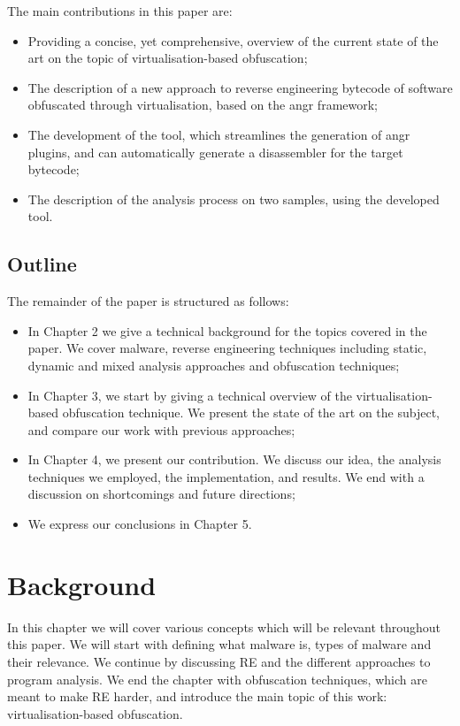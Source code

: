 The main contributions in this paper are:

\begin{itemize}
    \item Providing a concise, yet comprehensive, overview of the current state of the art on the topic of virtualisation-based obfuscation;
    \item The description of a new approach to reverse engineering bytecode of software obfuscated through virtualisation, based on the angr framework;
    \item The development of the  tool, which streamlines the generation of angr plugins, and can automatically generate a disassembler for the target bytecode;
    \item The description of the analysis process on two samples, using the developed tool.
\end{itemize}

\section{Outline}

The remainder of the paper is structured as follows:

\begin{itemize}
    \item In Chapter 2 we give a technical background for the topics covered in the paper. We cover malware, reverse engineering techniques including static, dynamic and mixed analysis approaches and obfuscation techniques;
    \item In Chapter 3, we start by giving a technical overview of the virtualisation-based obfuscation technique. We present the state of the art on the subject, and compare our work with previous approaches;
    \item In Chapter 4, we present our contribution. We discuss our idea, the analysis techniques we employed, the implementation, and results. We end with a discussion on shortcomings and future directions;
    \item We express our conclusions in Chapter 5.
\end{itemize}

\chapter{Background}

In this chapter we will cover various concepts which will be relevant throughout this paper. We will start with defining what malware is, types of malware and their relevance. We continue by discussing \gls{RE} and the different approaches to program analysis. We end the chapter with obfuscation techniques, which are meant to make \gls{RE} harder, and introduce the main topic of this work: virtualisation-based obfuscation.

